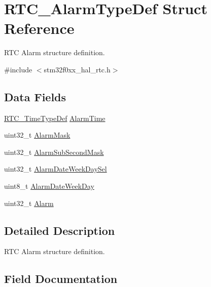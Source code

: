 \hypertarget{struct_r_t_c___alarm_type_def}{}\section{R\+T\+C\+\_\+\+Alarm\+Type\+Def Struct Reference}
\label{struct_r_t_c___alarm_type_def}


R\+TC Alarm structure definition.  




{\ttfamily \#include $<$stm32f0xx\+\_\+hal\+\_\+rtc.\+h$>$}

\subsection*{Data Fields}
\begin{DoxyCompactItemize}
\item 
\hyperlink{struct_r_t_c___time_type_def}{R\+T\+C\+\_\+\+Time\+Type\+Def} \hyperlink{struct_r_t_c___alarm_type_def_a8607cf90e5e86480f6093a0f78c9f0d8}{Alarm\+Time}
\item 
uint32\+\_\+t \hyperlink{struct_r_t_c___alarm_type_def_abf8acd34aba8f7a8e7c7d156a3af33c4}{Alarm\+Mask}
\item 
uint32\+\_\+t \hyperlink{struct_r_t_c___alarm_type_def_a039e2025c1ed1a817878070f54716f09}{Alarm\+Sub\+Second\+Mask}
\item 
uint32\+\_\+t \hyperlink{struct_r_t_c___alarm_type_def_a1c87355c52b57692c8de8da7c9954987}{Alarm\+Date\+Week\+Day\+Sel}
\item 
uint8\+\_\+t \hyperlink{struct_r_t_c___alarm_type_def_a48a4eec6d33bb4b06f408e8e28c0c0ed}{Alarm\+Date\+Week\+Day}
\item 
uint32\+\_\+t \hyperlink{struct_r_t_c___alarm_type_def_aee2915b5d05ac353d48f215764e80aa5}{Alarm}
\end{DoxyCompactItemize}


\subsection{Detailed Description}
R\+TC Alarm structure definition. 

\subsection{Field Documentation}
\mbox{\label{struct_r_t_c___alarm_type_def_aee2915b5d05ac353d48f215764e80aa5}} 
